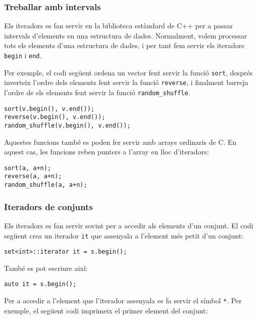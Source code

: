 \subsubsection{Treballar amb intervals}

Els iteradors es fan servir en la biblioteca estàndard de C++
per a passar intervals d'elements en una estructura de dades.
Normalment, volem processar tots els elements d'una
estructura de dades, i per tant fem servir els iteradors
\texttt{begin} i \texttt{end}.

Per exemple, el codi següent ordena un vector
fent servir la funció \texttt{sort},
després inverteix l'ordre dels elements fent servir la funció
\texttt{reverse}, i finalment barreja l'ordre de
els elements fent servir la funció \texttt{random\_shuffle}.


\begin{lstlisting}
sort(v.begin(), v.end());
reverse(v.begin(), v.end());
random_shuffle(v.begin(), v.end());
\end{lstlisting}

Aquestes funcions també es poden fer servir
amb arrays ordinaris de C. En aquest cas, les funcions reben
punters a l'array en lloc d'iteradors:

\begin{lstlisting}
sort(a, a+n);
reverse(a, a+n);
random_shuffle(a, a+n);
\end{lstlisting}

\subsubsection{Iteradors de conjunts}

Els iteradors es fan servir sovint per a accedir als
elements d'un conjunt.
El codi següent crea un iterador
\texttt{it} que assenyala a l'element més petit d'un conjunt:

\begin{lstlisting}
set<int>::iterator it = s.begin();
\end{lstlisting}
També es pot escriure així:
\begin{lstlisting}
auto it = s.begin();
\end{lstlisting}
Per a accedir a l'element que l'iterador assenyala es
fa servir el símbol \texttt{*}.
Per exemple, el següent codi imprimeix
el primer element del conjunt:

